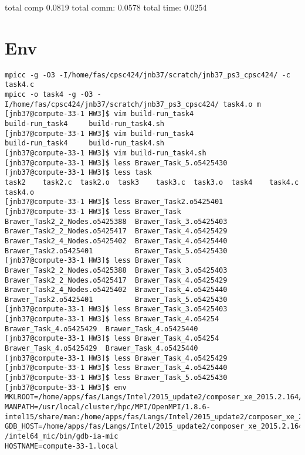 \documentclass[11pt]{article}
\begin{document}
total comp 0.0819
total comm: 0.0578
total time: 0.0254




\section{Env}
\label{sec:orgeacd0c6}

\begin{verbatim}
mpicc -g -O3 -I/home/fas/cpsc424/jnb37/scratch/jnb37_ps3_cpsc424/ -c task4.c
mpicc -o task4 -g -O3 -I/home/fas/cpsc424/jnb37/scratch/jnb37_ps3_cpsc424/ task4.o m
[jnb37@compute-33-1 HW3]$ vim build-run_task4
build-run_task4     build-run_task4.sh  
[jnb37@compute-33-1 HW3]$ vim build-run_task4
build-run_task4     build-run_task4.sh  
[jnb37@compute-33-1 HW3]$ vim build-run_task4.sh 
[jnb37@compute-33-1 HW3]$ less Brawer_Task_5.o5425430 
[jnb37@compute-33-1 HW3]$ less task
task2    task2.c  task2.o  task3    task3.c  task3.o  task4    task4.c  task4.o
[jnb37@compute-33-1 HW3]$ less Brawer_Task2.o5425401 
[jnb37@compute-33-1 HW3]$ less Brawer_Task
Brawer_Task2_2_Nodes.o5425388  Brawer_Task_3.o5425403
Brawer_Task2_2_Nodes.o5425417  Brawer_Task_4.o5425429
Brawer_Task2_4_Nodes.o5425402  Brawer_Task_4.o5425440
Brawer_Task2.o5425401          Brawer_Task_5.o5425430
[jnb37@compute-33-1 HW3]$ less Brawer_Task
Brawer_Task2_2_Nodes.o5425388  Brawer_Task_3.o5425403
Brawer_Task2_2_Nodes.o5425417  Brawer_Task_4.o5425429
Brawer_Task2_4_Nodes.o5425402  Brawer_Task_4.o5425440
Brawer_Task2.o5425401          Brawer_Task_5.o5425430
[jnb37@compute-33-1 HW3]$ less Brawer_Task_3.o5425403 
[jnb37@compute-33-1 HW3]$ less Brawer_Task_4.o54254   
Brawer_Task_4.o5425429  Brawer_Task_4.o5425440  
[jnb37@compute-33-1 HW3]$ less Brawer_Task_4.o54254
Brawer_Task_4.o5425429  Brawer_Task_4.o5425440  
[jnb37@compute-33-1 HW3]$ less Brawer_Task_4.o5425429 
[jnb37@compute-33-1 HW3]$ less Brawer_Task_4.o5425440 
[jnb37@compute-33-1 HW3]$ less Brawer_Task_5.o5425430 
[jnb37@compute-33-1 HW3]$ env
MKLROOT=/home/apps/fas/Langs/Intel/2015_update2/composer_xe_2015.2.164/mkl
MANPATH=/usr/local/cluster/hpc/MPI/OpenMPI/1.8.6-intel15/share/man:/home/apps/fas/Langs/Intel/2015_update2/composer_xe_2015.2.164/man/en_US:/home/apps/fas/Langs/Intel/2015_update2/composer_xe_2015.2.164/debugger/gdb/intel64/share/man/:/home/apps/fas/Langs/Intel/2015_update2/composer_xe_2015.2.164/debugger/gdb/intel64_mic/share/man/:/usr/share/man:/opt/moab/share/man:
GDB_HOST=/home/apps/fas/Langs/Intel/2015_update2/composer_xe_2015.2.164/debugger/gdb
/intel64_mic/bin/gdb-ia-mic
HOSTNAME=compute-33-1.local

\end{verbatim}
\end{document}
